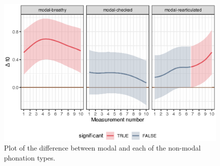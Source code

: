 \begin{figure}[h!]
    \centering
    \includegraphics[]{images/LCH_GAMMs/f0_model_diff.eps}
    \caption{Plot of the difference between modal and each of the non-modal phonation types.}
    \label{fig:f0_model_diff}
\end{figure}


